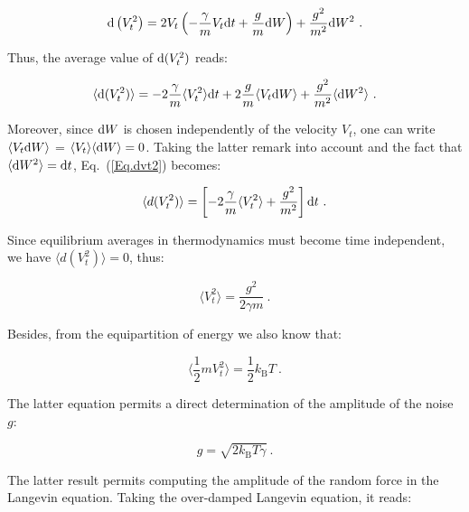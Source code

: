 \begin{equation}
	\textnormal{d}\left(V_t^2\right) = 2V_t\left( -\frac{\gamma}{m}V_t\textnormal{d}t + \frac{g}{m}\textnormal{d}W  \right) + \frac{g^2}{m^2}\textnormal{d}W ^2 ~. 
\end{equation}

Thus, the average value of $ \textnormal{d}(V_t ^2)$ reads:

\begin{equation}
	\langle \textnormal{d}(V_t ^2)\rangle = -2 \frac{\gamma}{m} \langle V_t ^2 \rangle \textnormal dt + 2 \frac{g}{m} \langle V_t \textnormal{d}W \rangle + \frac{g^2}{m^2} \langle \textnormal{d}W ^2 \rangle~.
	\label{Eq.dvt2}
\end{equation} 

Moreover, since $\textnormal{d}W$ is chosen independently of the velocity $V_t$, one can write $\langle V_t \textnormal{d}W \rangle $ = $\langle V_t \rangle \langle \textnormal{d}W \rangle  =0 $. Taking the latter remark into account and the fact that $\langle \textnormal{d}W ^2\rangle = \textnormal{d}t $, Eq.~(\ref{Eq.dvt2}) becomes:

\begin{equation}
	\langle d(V_t^2) \rangle = \left[-2 \frac{\gamma}{m} \langle V_t ^2 \rangle + \frac{g^2}{m^2}\right]\textnormal{d}t~.
\end{equation}

Since equilibrium averages in thermodynamics must become time independent, we have $\langle d(V_t^2) \rangle = 0$, thus:

\begin{equation}
	\langle V_t ^2\rangle = \frac{g ^2}{2 \gamma m}~. 
\end{equation}

Besides, from the equipartition of energy we also know that:

\begin{equation}
	\langle \frac{1}{2} m V_t ^2 \rangle  = \frac{1}{2} k_\mathrm{B} T~.
\end{equation}

The latter equation permits a direct determination of the amplitude of the noise $g$: 

\begin{equation}
	g = \sqrt{2k_\mathrm{B}T \gamma}~.
\end{equation}

The latter result permits computing the amplitude of the random force in the Langevin equation. Taking the over-damped Langevin equation, it reads:

